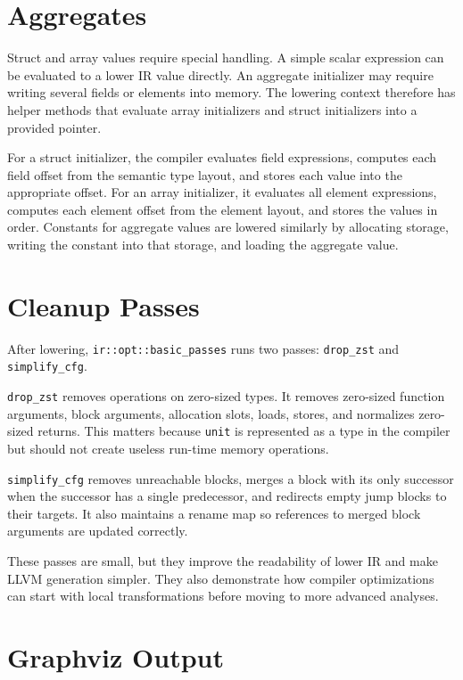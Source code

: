 \section{Aggregates}

Struct and array values require special handling. A simple scalar expression can
be evaluated to a lower IR value directly. An aggregate initializer may require
writing several fields or elements into memory. The lowering context therefore
has helper methods that evaluate array initializers and struct initializers into
a provided pointer.

For a struct initializer, the compiler evaluates field expressions, computes
each field offset from the semantic type layout, and stores each value into the
appropriate offset. For an array initializer, it evaluates all element
expressions, computes each element offset from the element layout, and stores
the values in order. Constants for aggregate values are lowered similarly by
allocating storage, writing the constant into that storage, and loading the
aggregate value.

\section{Cleanup Passes}

After lowering, \texttt{ir::opt::basic\_passes} runs two passes:
\texttt{drop\_zst} and \texttt{simplify\_cfg}.

\texttt{drop\_zst} removes operations on zero-sized types. It removes zero-sized
function arguments, block arguments, allocation slots, loads, stores, and
normalizes zero-sized returns. This matters because \texttt{unit} is represented
as a type in the compiler but should not create useless run-time memory
operations.

\texttt{simplify\_cfg} removes unreachable blocks, merges a block with its only
successor when the successor has a single predecessor, and redirects empty jump
blocks to their targets. It also maintains a rename map so references to merged
block arguments are updated correctly.

These passes are small, but they improve the readability of lower IR and make
LLVM generation simpler. They also demonstrate how compiler optimizations can
start with local transformations before moving to more advanced analyses.

\section{Graphviz Output}

